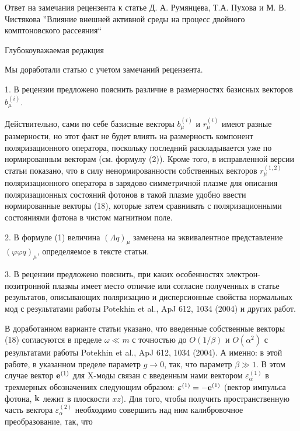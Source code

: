 \documentclass[12pt]{article}
\newcommand{\bs}{\boldsymbol}
\begin{document}
\large
\begin{center}

           Ответ на замечания рецензента к статье Д. А. Румянцева, Т.А. Пухова и М. В. Чистякова
      ''Влияние внешней активной среды на процесс двойного комптоновского рассеяния`` 
\end{center}

\centerline{Глубокоуважаемая редакция}

\vspace{5mm}

    Мы доработали статью с учетом замечаний рецензента. 

 
   1. В рецензии предложено пояснить различие в размерностях базисных векторов $b_{\mu}^{(i)}$. 

   Действительно, сами по себе базисные векторы $b_{\mu}^{(i)}$  и $r_{\mu}^{(i)}$ имеют разные 
   размерности, но этот факт не будет влиять на размерность компонент поляризационного оператора, 
   поскольку последний раскладывается уже по нормированным векторам (см. формулу (2)). Кроме того, 
   в исправленной версии статьи показано, что  в силу ненормированности собственных векторов 
   $r_{\mu}^{(1,2)}$  поляризационного оператора в зарядово симметричной плазме для описания 
   поляризационных состояний фотонов в такой плазме удобно ввести нормированные векторы (18), 
   которые затем сравнивать с поляризационными состояниями фотона в чистом магнитном поле.


   2. В формуле (1) величина $(\Lambda q)_\mu$ заменена на эквивалентное представление 
   $(\varphi \varphi q)_\mu$, определяемое в тексте статьи.

   
   3. В рецензии предложено  пояснить, при каких особенностях электрон-позитронной плазмы имеет место 
   отличие или согласие полученных в статье результатов, описывающих поляризацию и дисперсионные 
   свойства нормальных мод с результатами работы Potekhin et al., ApJ 612, 1034 (2004) и других работ.

   
   В доработанном варианте статьи указано, что введенные собственные векторы (18) согласуются в пределе 
   $\omega \ll m$ с точностью до $O(1/\beta)$ и $O(\alpha^2)$ с результатами работы  
   Potekhin et al., ApJ 612, 1034 (2004). А именно: в  этой  работе, в указанном пределе параметр $g \to 0$, 
   так, что параметр $\beta \gg 1$. В этом случае вектор ${\bf e}^{(1)}$  для X-моды связан с введенным 
   нами вектором $\varepsilon^{(1)}_\alpha$ в трехмерных обозначениях следующим образом:
   ${\bs \varepsilon}^{(1)} = - {\bf e}^{(1)}$ (вектор импульса фотона, ${\bf k}$ лежит в плоскости $xz$).
   Для того, чтобы получить пространственную часть вектора $\varepsilon^{(2)}_\alpha$ необходимо совершить 
   над ним калибровочное преобразование, так, что 
\end{document}
